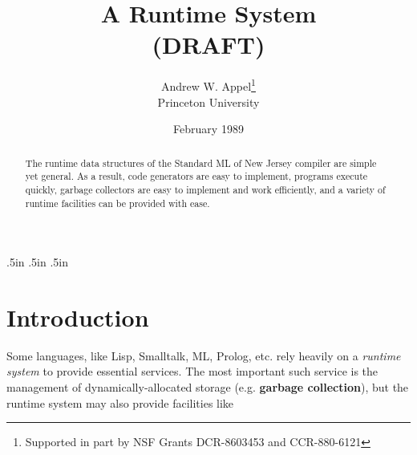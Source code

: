 \makeindex
    \oddsidemargin   .5in     %
    \evensidemargin  .5in     %
   \topmargin       .5in    %
   \headheight        0pt    %
   \headsep           0pt    %
   \footheight       12pt    %
   \footskip         30pt    %
   \textwidth         5.5in  %


\sloppy


\title{A Runtime System \\ (DRAFT)}
\author{Andrew W. Appel\thanks{
Supported in part by NSF Grants
DCR-8603453 and CCR-880-6121}
        \\ Princeton University}
\date{February 1989}
\maketitle
\begin{abstract} 
The runtime data structures of the Standard ML of New Jersey compiler
are simple yet general.  As a result, code generators are easy to implement,
programs execute quickly, garbage collectors are easy to implement and
work efficiently, and a variety of runtime facilities can be provided with
ease.
\end{abstract}

\section{Introduction}
\label{introduction}

Some languages, like Lisp, Smalltalk, ML, Prolog, etc. rely heavily on a
{\em runtime system} to provide essential services.  The most important
such service is the management of dynamically-allocated storage
(e.g. {\bf garbage collection}), but the runtime system may also provide
facilities like

